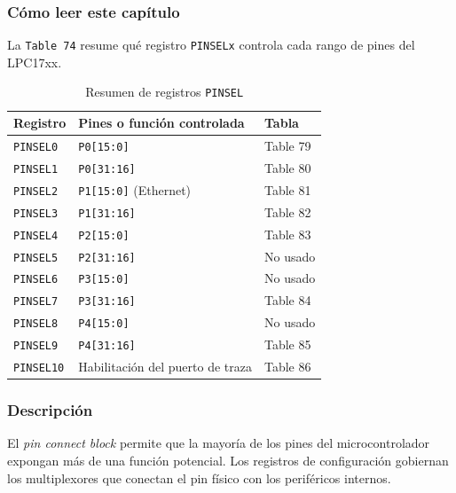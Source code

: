 \subsubsection{Cómo leer este capítulo}
La \texttt{Table 74} resume qué registro \texttt{PINSELx} controla cada rango de pines del LPC17xx.

\begin{table}[H]
  \centering
  \small
  \renewcommand{\arraystretch}{1.15}
  \caption{Resumen de registros \texttt{PINSEL}}
  \begin{tabularx}{0.92\textwidth}{|>{\raggedright\arraybackslash}p{}|>{\raggedright\arraybackslash}X|>{\raggedright\arraybackslash}p{}|}
    \hline
    \textbf{Registro} & \textbf{Pines o función controlada} & \textbf{Tabla} \\
    \hline
    \texttt{PINSEL0} & \texttt{P0[15:0]} & Table 79 \\
    \hline
    \texttt{PINSEL1} & \texttt{P0[31:16]} & Table 80 \\
    \hline
    \texttt{PINSEL2} & \texttt{P1[15:0]} (Ethernet) & Table 81 \\
    \hline
    \texttt{PINSEL3} & \texttt{P1[31:16]} & Table 82 \\
    \hline
    \texttt{PINSEL4} & \texttt{P2[15:0]} & Table 83 \\
    \hline
    \texttt{PINSEL5} & \texttt{P2[31:16]} & No usado \\
    \hline
    \texttt{PINSEL6} & \texttt{P3[15:0]} & No usado \\
    \hline
    \texttt{PINSEL7} & \texttt{P3[31:16]} & Table 84 \\
    \hline
    \texttt{PINSEL8} & \texttt{P4[15:0]} & No usado \\
    \hline
    \texttt{PINSEL9} & \texttt{P4[31:16]} & Table 85 \\
    \hline
    \texttt{PINSEL10} & Habilitación del puerto de traza & Table 86 \\
    \hline
  \end{tabularx}
\end{table}

\subsubsection{Descripción}
El \textit{pin connect block} permite que la mayoría de los pines del microcontrolador expongan más de una función potencial. Los registros de configuración gobiernan los multiplexores que conectan el pin físico con los periféricos internos.

